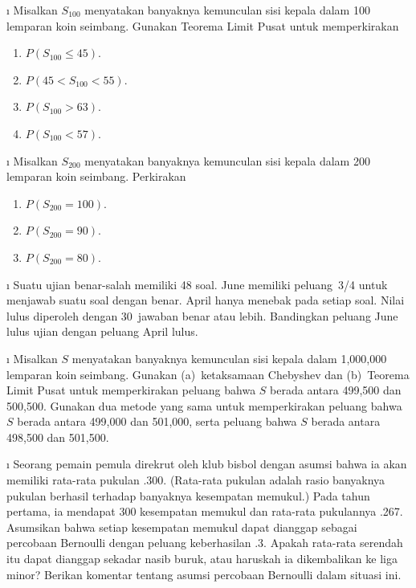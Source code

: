 \exercises
\begin{LJSItem}

\i\label{exer 9.1.1}  Misalkan $S_{100}$ menyatakan banyaknya kemunculan sisi kepala dalam 100 lemparan
koin seimbang.  Gunakan Teorema Limit Pusat untuk memperkirakan
\begin{enumerate}

\item  $P(S_{100} \leq 45)$.

\item  $P(45 < S_{100} < 55)$.

\item  $P(S_{100} > 63)$.

\item $P(S_{100} < 57)$.
\end{enumerate}

\i\label{exer 9.1.2}  Misalkan $S_{200}$ menyatakan banyaknya kemunculan sisi kepala dalam 200 lemparan
koin seimbang.  Perkirakan
\begin{enumerate}

\item  $P(S_{200} = 100)$. 

\item  $P(S_{200} = 90)$. 

\item  $P(S_{200} = 80)$. 
\end{enumerate}

\i\label{exer 9.1.3}  Suatu ujian benar-salah memiliki 48 soal.  June memiliki peluang~3/4 untuk
menjawab suatu soal dengan benar.  April hanya menebak pada setiap soal.  Nilai
lulus diperoleh dengan 30~jawaban benar atau lebih.  Bandingkan peluang June
lulus ujian dengan peluang April lulus.

\i\label{exer 9.1.4}  Misalkan $S$ menyatakan banyaknya kemunculan sisi kepala dalam 1{,}000{,}000 lemparan
koin seimbang.  Gunakan (a)~ketaksamaan Chebyshev dan (b)~Teorema Limit Pusat untuk
memperkirakan peluang bahwa $S$ berada antara 499{,}500 dan 500{,}500.  Gunakan
dua metode yang sama untuk memperkirakan peluang bahwa $S$ berada antara
499{,}000 dan 501{,}000, serta peluang bahwa $S$ berada antara 498{,}500
dan 501{,}500.

\i\label{exer 9.1.5}  Seorang pemain pemula direkrut oleh klub bisbol dengan asumsi bahwa ia akan
memiliki rata-rata pukulan .300.  (Rata-rata pukulan adalah rasio banyaknya
pukulan berhasil terhadap banyaknya kesempatan memukul.)  Pada tahun pertama, ia mendapat 300
kesempatan memukul dan rata-rata pukulannya .267.  Asumsikan bahwa setiap kesempatan memukul dapat dianggap sebagai
percobaan Bernoulli dengan peluang keberhasilan .3.  Apakah rata-rata serendah itu dapat
dianggap sekadar nasib buruk, atau haruskah ia dikembalikan ke liga minor? 
Berikan komentar tentang asumsi percobaan Bernoulli dalam situasi ini.


\end{LJSItem}
